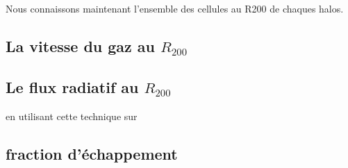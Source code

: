 Nous connaissons maintenant l'ensemble des cellules au R200 de chaques halos.

\subsection{La vitesse du gaz au $R_{200}$}



\subsection{Le flux radiatif au $R_{200}$}
en utilisant cette technique sur 



\subsection{fraction d'échappement}

